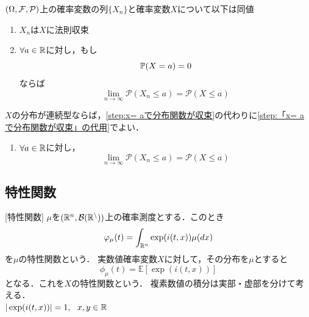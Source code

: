 \documentclass[dvipdfmx, leqno]{jsbook}
\begin{document}
    $(\Omega, \F, \mathcal{P})$上の確率変数の列$\{X_n\}$と確率変数$X$について以下は同値
\begin{enumerate}
    \item 
    $X_n$は$X$に法則収束
    \item\label{step:x= aで分布関数が収束} 
    $\forall a\in \R$に対し，もし
\begin{equation}
    \P(X= a)= 0
\end{equation}
    ならば
\begin{equation}
    \lim_{n\to \infty} \mathcal{P}(X_n\le a)= \mathcal{P}(X\le a)
\end{equation}
\end{enumerate}

    $X$の分布が連続型ならば，\eqref{step:x= aで分布関数が収束}の代わりに\eqref{step:「x= aで分布関数が収束」の代用}でよい．
\begin{enumerate}
    \item [$(2)'$]\label{step:「x= aで分布関数が収束」の代用}
    $\forall a\in \R$に対し，
\begin{equation}
    \lim_{n\to \infty} \mathcal{P}(X_n\le a)= \mathcal{P}(X\le a)
\end{equation}
\end{enumerate}

\subsection{特性関数}
[特性関数]
    $\mu$を$(\R^n, \mathcal{B(\R^n)})$上の確率測度とする．このとき
\begin{equation}
    \phi_\mu(t)= \int_{\R^n} \exp(i(t, x))\mu(dx)
\end{equation}
    を$\mu$の特性関数という．
    実数値確率変数$X$に対して，その分布を$\mu$とすると
\begin{equation}
    \phi_\mu(t)= \mathbb{E}[\exp(i(t, x))]
\end{equation}
    となる．これを$X$の特性関数という．
    複素数値の積分は実部・虚部を分けて考える．\\
    $|\exp(i(t, x))|= 1,\ \ x, y\in \R$
\end{document}
